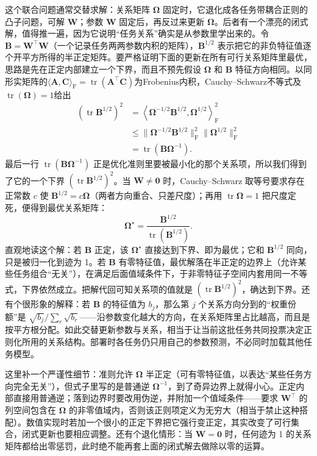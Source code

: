 这个联合问题通常交替求解：关系矩阵 $\bm\Omega$ 固定时，它退化成各任务带耦合正则的凸子问题，可解 $\bm W$；参数 $\bm W$ 固定后，再反过来更新 $\bm\Omega$。后者有一个漂亮的闭式解，值得推一遍，因为它说明“任务关系”确实是从参数里学出来的。令 $\bm B=\bm W^{\top}\bm W$（一个记录任务两两参数内积的矩阵），$\bm B^{1/2}$ 表示把它的非负特征值逐个开平方所得的半正定矩阵。要严格证明下面的更新在所有可行关系矩阵里最优，思路是先在正定内部建立一个下界，而且不预先假设 $\bm\Omega$ 和 $\bm B$ 特征方向相同。以同形实矩阵的$\langle\bm A,\bm C\rangle_{\mathrm F}=\operatorname{tr}(\bm A^{\top}\bm C)$为Frobenius内积，Cauchy--Schwarz不等式及$\operatorname{tr}(\bm\Omega)=1$给出
\[
  \begin{aligned}
    (\operatorname{tr}\bm B^{1/2})^2
      &=\left\langle\bm\Omega^{-1/2}\bm B^{1/2},
                      \bm\Omega^{1/2}\right\rangle_{\mathrm F}^{2}\\
      &\leq\|\bm\Omega^{-1/2}\bm B^{1/2}\|_{\mathrm F}^{2}
             \|\bm\Omega^{1/2}\|_{\mathrm F}^{2}\\
      &=\operatorname{tr}(\bm B\bm\Omega^{-1}).
  \end{aligned}
\]
最后一行 $\operatorname{tr}(\bm B\bm\Omega^{-1})$ 正是优化准则里要被最小化的那个关系项，所以我们得到了它的一个下界 $(\operatorname{tr}\bm B^{1/2})^2$。当 $\bm W\ne\bm0$ 时，Cauchy–Schwarz 取等号要求存在正常数 $c$ 使 $\bm B^{1/2}=c\bm\Omega$（两者方向重合、只差尺度）；再用 $\operatorname{tr}\bm\Omega=1$ 把尺度定死，便得到最优关系矩阵：
\begin{equation}
  \bm\Omega^\star
  =\frac{\bm B^{1/2}}
    {\operatorname{tr}(\bm B^{1/2})}.
  \label{eq:ket-sharing-mtrl-omega}
\end{equation}
直观地读这个解：若 $\bm B$ 正定，该 $\bm\Omega^\star$ 直接达到下界、即为最优；它和 $\bm B^{1/2}$ 同向，只是被归一化到迹为 1。若 $\bm B$ 有零特征值，最优解落在半正定的边界上（允许某些任务组合“无关”），在满足后面值域条件下，于非零特征子空间内套用同一不等式，下界依然成立。把解代回可知关系项的值就是 $(\operatorname{tr}\bm B^{1/2})^2$，确达到下界。还有个很形象的解释：若 $\bm B$ 的特征值为 $b_j$，那么第 $j$ 个关系方向分到的“权重份额”是 $\sqrt{b_j}/\sum_r\sqrt{b_r}$——沿参数变化越大的方向，在关系矩阵里占比越高，而且是按平方根分配。如此交替更新参数与关系，相当于让当前这批任务共同投票决定正则化所用的关系结构。部署时各任务仍只用自己的参数预测，不必同时加载其他任务模型。

这里补一个严谨性细节：准则允许 $\bm\Omega$ 半正定（可有零特征值，以表达“某些任务方向完全无关”），但式子里写的是普通逆 $\bm\Omega^{-1}$，到了奇异边界上就得小心。正定内部直接用普通逆；落到边界时要改用伪逆，并附加一个值域条件——要求 $\bm W^{\top}$ 的列空间包含在 $\bm\Omega$ 的非零值域内，否则该正则项定义为无穷大（相当于禁止这种搭配）。数值实现时若加一个很小的正定下界把它强行变正定，其实改变了可行集合，闭式更新也要相应调整。还有个退化情形：当 $\bm W=\bm0$ 时，任何迹为 1 的关系矩阵都给出零惩罚，此时绝不能再套上面的闭式解去做除以零的运算。


